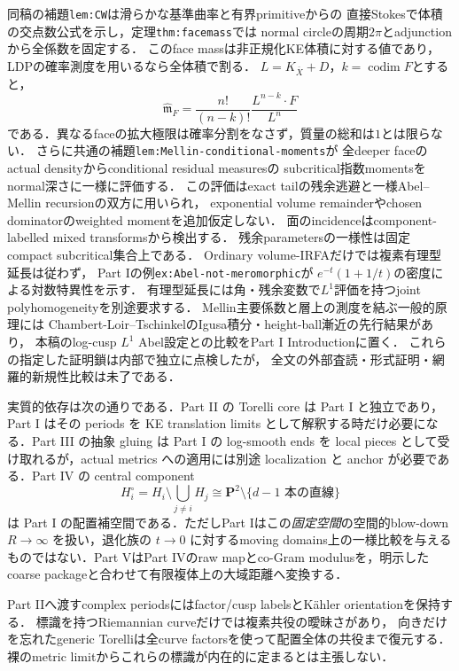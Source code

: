 \documentclass[a4paper,11pt]{ltjsarticle}
\numberwithin{equation}{section}
\theoremstyle{plain}
\theoremstyle{definition}
\theoremstyle{remark}
\newcommand{\PP}{\mathbf P}
\begin{document}
同稿の補題\texttt{lem:CW}は滑らかな基準曲率と有界primitiveからの
直接Stokesで体積の交点数公式を示し，定理\texttt{thm:facemass}では
normal circleの周期$2\pi$とadjunctionから全係数を固定する．
このface massは非正規化KE体積に対する値であり，
LDPの確率測度を用いるなら全体積で割る．
$L=K_{\overline X}+D$，$k=\operatorname{codim}F$とすると，
\[
 \widehat{\mathfrak m}_F
 =\frac{n!}{(n-k)!}\frac{L^{n-k}\cdot F}{L^n}
\]
である．異なるfaceの拡大極限は確率分割をなさず，質量の総和は$1$とは限らない．
さらに共通の補題\texttt{lem:Mellin-conditional-moments}が
全deeper faceのactual densityからconditional residual measuresの
subcritical指数momentsをnormal深さに一様に評価する．
この評価はexact tailの残余逃避と一様Abel--Mellin recursionの双方に用いられ，
exponential volume remainderやchosen dominatorのweighted momentを追加仮定しない．
面のincidenceはcomponent-labelled mixed transformsから検出する．
残余parametersの一様性は固定compact subcritical集合上である．
Ordinary volume-IRFAだけでは複素有理型延長は従わず，
Part Iの例\texttt{ex:Abel-not-meromorphic}が
$e^{-t}(1+1/t)$の密度による対数特異性を示す．
有理型延長には角・残余変数で$L^1$評価を持つjoint polyhomogeneityを別途要求する．
Mellin主要係数と層上の測度を結ぶ一般的原理には
Chambert-Loir--TschinkelのIgusa積分・height-ball漸近の先行結果があり，
本稿のlog-cusp $L^1$ Abel設定との比較をPart I Introductionに置く．
これらの指定した証明鎖は内部で独立に点検したが，
全文の外部査読・形式証明・網羅的新規性比較は未了である．

実質的依存は次の通りである．Part II の Torelli core は Part I と独立であり，Part I はその periods を KE translation limits として解釈する時だけ必要になる．Part III の抽象 gluing は Part I の log-smooth ends を local pieces として受け取れるが，actual metrics への適用には別途 localization と anchor が必要である．Part IV の central component
\[
 H_i^\circ=H_i\setminus\bigcup_{j\ne i}H_j
 \cong\PP^2\setminus\{d-1\text{ 本の直線}\}
\]
は Part I の配置補空間である．ただしPart Iはこの\emph{固定空間}の空間的blow-down \(R\to\infty\) を扱い，退化族の \(t\to0\) に対するmoving domains上の一様比較を与えるものではない．Part VはPart IVのraw mapとco-Gram modulusを，明示したcoarse packageと合わせて有限複体上の大域距離へ変換する．

Part IIへ渡すcomplex periodsにはfactor/cusp labelsとK\"ahler orientationを保持する．
標識を持つRiemannian curveだけでは複素共役の曖昧さがあり，
向きだけを忘れたgeneric Torelliは全curve factorsを使って配置全体の共役まで復元する．
裸のmetric limitからこれらの標識が内在的に定まるとは主張しない．
\end{document}
